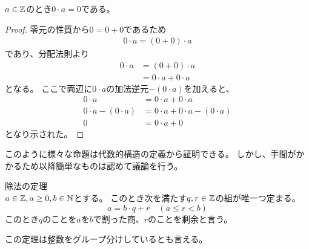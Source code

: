 \documentclass[uplatex, 11pt, a4j, dvipdfmx]{jsarticle}
\begin{document}
  \begin{screen}
    \begin{prop}
      $a \in \mathbb{Z}$のとき$0 \cdot a = 0$である。
    \end{prop}
    \begin{proof}
      零元の性質から$0 = 0 + 0$であるため
      \begin{equation} \begin{aligned}
        0 \cdot a = (0 + 0) \cdot a
      \end{aligned} \end{equation}
      であり、分配法則より
      \begin{equation} \begin{aligned}
        0 \cdot a &= (0 + 0) \cdot a \\
                  &= 0 \cdot a + 0 \cdot a
      \end{aligned} \end{equation}
      となる。
      ここで両辺に$0 \cdot a$の加法逆元$-(0 \cdot a)$を加えると、
      \begin{equation} \begin{aligned}
        0 \cdot a               &= 0 \cdot a + 0 \cdot a \\
        0 \cdot a - (0 \cdot a) &= 0 \cdot a + 0 \cdot a  - (0 \cdot a) \\
        0                       &= 0 \cdot a + 0
      \end{aligned} \end{equation}
      となり示された。
    \end{proof}
  \end{screen}

  このように様々な命題は代数的構造の定義から証明できる。
  しかし、手間がかかるため以降簡単なものは認めて議論を行う。

  \begin{screen}
    \begin{thm}
      \label{thm:division-theorem}
      除法の定理\\
      $a \in \mathbb{Z}, a \geq 0, b \in \mathbb{N}$とする。
      このとき次を満たす$q, r \in \mathbb{Z}$の組が唯一つ定まる。
      \begin{equation}
        a = b \cdot q + r \quad (a \leq r < b)
      \end{equation}
      このとき$q$のことを$a$を$b$で割った商、$r$のことを剰余と言う。

      この定理は整数をグループ分けしているとも言える。
    \end{thm}
  \end{screen}
\end{document}
